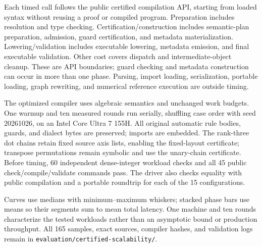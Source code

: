 Each timed call follows the public certified compilation API, starting from
loaded syntax without reusing a proof or compiled program. Preparation
includes resolution and type checking. Certification/construction includes
semantic-plan preparation, admission, guard certification, and metadata
materialization. Lowering/validation includes executable lowering, metadata
emission, and final executable validation. Other cost covers dispatch and
intermediate-object cleanup. These are API boundaries; guard checking and
metadata construction can occur in more than one phase. Parsing, import
loading, serialization, portable loading, graph rewriting, and numerical
reference execution are outside timing.

The optimized compiler uses algebraic semantics and unchanged work budgets.
One warmup and ten measured rounds run serially, shuffling case order with
seed 20261026, on an Intel Core Ultra 7 155H. All original automatic rule
bodies, guards, and dialect bytes are preserved; imports are embedded.
The rank-three dot chains retain fixed source axis lists, enabling the
fixed-layout certificate; transpose permutations remain symbolic and use
the unary-chain certificate. Before timing, 60 independent dense-integer
workload checks and all 45 public check/compile/validate commands pass.
The driver also checks equality with public compilation and a portable
roundtrip for each of the 15 configurations.

Curves use medians with minimum--maximum whiskers; stacked phase bars use
means so their segments sum to mean total latency. One machine and ten
rounds characterize the tested workloads rather than an asymptotic bound
or production throughput. All 165 samples, exact sources, compiler hashes,
and validation logs remain in
\nolinkurl{evaluation/certified-scalability/}.
